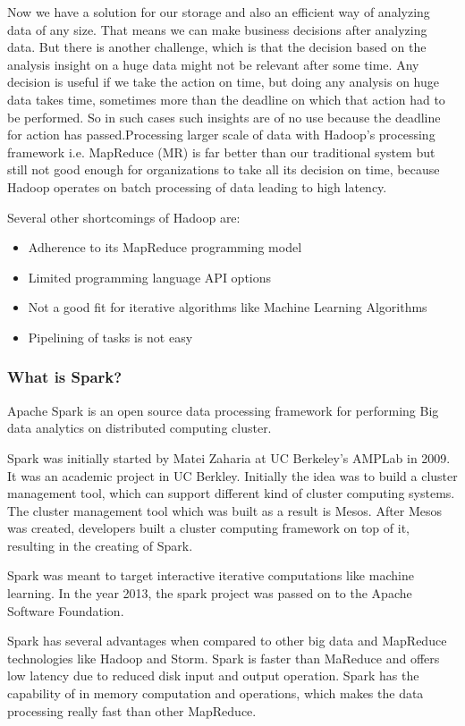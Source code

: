 Now we have a solution for our storage and also an efficient way of analyzing data of any size. That means we can make business decisions after analyzing data. But there is another challenge, which is that the decision based on the analysis insight on a huge data might not be relevant after some time. Any decision is useful if we take the action on time, but doing any analysis on huge data takes time, sometimes more than the deadline on which that action had to be performed. So in such cases such insights are of no use because the deadline for action has passed.Processing larger scale of data with Hadoop’s processing framework i.e. MapReduce (MR) is far better than our traditional system but still not good enough for organizations to take all its decision on time, because Hadoop operates on batch processing of data leading to high latency.

Several other shortcomings of Hadoop are:\\

\begin{itemize}
	\item Adherence to its MapReduce programming model
	\item Limited programming language API options
	\item Not a good fit for iterative algorithms like Machine Learning Algorithms
	\item Pipelining of tasks is not easy
\end{itemize}
\subsubsection{What is Spark?}
Apache Spark is an open source data processing framework for performing Big data analytics on distributed computing cluster.

Spark was initially started by Matei Zaharia at UC Berkeley's AMPLab in 2009. It was an academic project in UC Berkley. Initially the idea was to build a cluster management tool, which can support different kind of cluster computing systems. The cluster management tool which was built as a result is Mesos. After Mesos was created, developers built a cluster computing framework on top of it, resulting in the creating of Spark.

Spark was meant to target interactive iterative computations like machine learning. In the year 2013, the spark project was passed on to the Apache Software Foundation.

Spark has several advantages when compared to other big data and MapReduce technologies like Hadoop and Storm. Spark is faster than MaReduce and offers low latency due to reduced disk input and output operation. Spark has the capability of in memory computation and operations, which makes the data processing really fast than other MapReduce.

